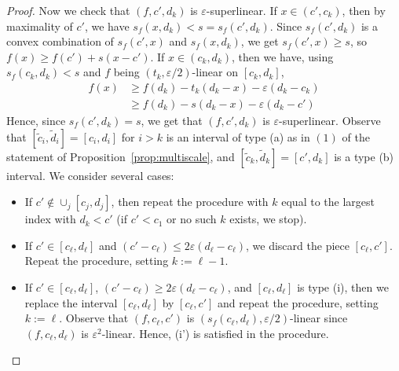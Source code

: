 \documentclass{amsart}
\newcommand{\eps}{\varepsilon}
\newcommand{\tc}{\tilde{c}}
\newcommand{\td}{\tilde{d}}
\begin{document}
\begin{proof}
    Now we check that $(f, c', d_k)$ is $\eps$-superlinear. If $x \in (c', c_k)$, then by maximality of $c'$, we have $s_f (x, d_k) < s = s_f (c', d_k)$. Since $s_f (c', d_k)$ is a convex combination of $s_f (c', x)$ and $s_f (x, d_k)$, we get $s_f (c', x) \ge s$, so $f(x) \ge f(c') + s(x - c')$. If $x \in (c_k, d_k)$, then we have, using $s_f (c_k, d_k) < s$ and $f$ being $(t_k, \eps/2)$-linear on $[c_k, d_k]$,
    \begin{align}
        f(x) &\ge f(d_k) - t_k (d_k - x) - \eps (d_k - c_k) \nonumber\\
            &\ge f(d_k) - s (d_k - x) - \eps (d_k - c') \label{align1}
    \end{align}
    Hence, since $s_f (c', d_k) = s$, we get that $(f, c', d_k)$ is $\eps$-superlinear. Observe that $[\tc_i, \td_i] = [c_i, d_i]$ for $i > k$ is an interval of type (a) as in $(1)$ of the statement of Proposition~\ref{prop:multiscale}, and $[\tc_k, \td_k] = [c', d_k]$ is a type (b) interval. We consider several cases:
    \begin{itemize}
        \item If $c' \notin \cup_j [c_j, d_j]$, then repeat the procedure with $k$ equal to the largest index with $d_k < c'$ (if $c' < c_1$ or no such $k$ exists, we stop).

        \item If $c' \in [c_\ell, d_\ell]$ and $(c' - c_\ell) \le 2\eps (d_\ell - c_\ell)$, we discard the piece $[c_\ell, c']$. Repeat the procedure, setting $k := \ell - 1$.

        \item If $c' \in [c_\ell, d_\ell]$, $(c' - c_\ell) \ge 2\eps (d_\ell - c_\ell)$, and $[c_\ell, d_\ell]$ is type (i), then we replace the interval $[c_\ell, d_\ell]$ by $[c_\ell, c']$ and repeat the procedure, setting $k := \ell$. Observe that $(f, c_\ell, c')$ is $(s_f (c_\ell, d_\ell), \eps/2)$-linear since $(f, c_\ell, d_\ell)$ is $\eps^2$-linear. Hence, (i') is satisfied in the procedure.


\end{itemize}
\end{proof}
\end{document}
